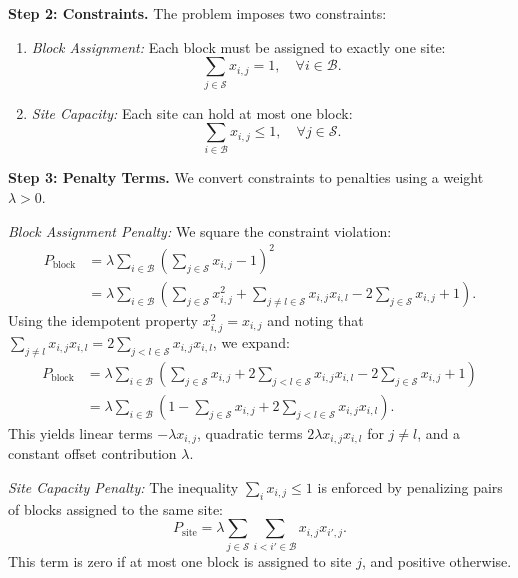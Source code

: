 \documentclass[12pt]{article}
\begin{document}
\textbf{Step 2: Constraints.}
The problem imposes two constraints:
\begin{enumerate}
    \item \textit{Block Assignment:} Each block must be assigned to exactly one site:
    \begin{equation}
        \sum_{j \in \mathcal{S}} x_{i,j} = 1, \quad \forall i \in \mathcal{B}.
    \end{equation}
    \item \textit{Site Capacity:} Each site can hold at most one block:
    \begin{equation}
        \sum_{i \in \mathcal{B}} x_{i,j} \le 1, \quad \forall j \in \mathcal{S}.
    \end{equation}
\end{enumerate}

\textbf{Step 3: Penalty Terms.}
We convert constraints to penalties using a weight $\lambda > 0$.

\textit{Block Assignment Penalty:}
We square the constraint violation:
\begin{align}
    P_{\text{block}} &= \lambda \sum_{i \in \mathcal{B}} \left( \sum_{j \in \mathcal{S}} x_{i,j} - 1 \right)^2 \\
    &= \lambda \sum_{i \in \mathcal{B}} \left( \sum_{j \in \mathcal{S}} x_{i,j}^2 + \sum_{j \neq l \in \mathcal{S}} x_{i,j} x_{i,l} - 2 \sum_{j \in \mathcal{S}} x_{i,j} + 1 \right).
\end{align}
Using the idempotent property $x_{i,j}^2 = x_{i,j}$ and noting that $\sum_{j \neq l} x_{i,j} x_{i,l} = 2 \sum_{j < l \in \mathcal{S}} x_{i,j} x_{i,l}$, we expand:
\begin{align}
    P_{\text{block}} &= \lambda \sum_{i \in \mathcal{B}} \left( \sum_{j \in \mathcal{S}} x_{i,j} + 2 \sum_{j < l \in \mathcal{S}} x_{i,j} x_{i,l} - 2 \sum_{j \in \mathcal{S}} x_{i,j} + 1 \right) \\
    &= \lambda \sum_{i \in \mathcal{B}} \left( 1 - \sum_{j \in \mathcal{S}} x_{i,j} + 2 \sum_{j < l \in \mathcal{S}} x_{i,j} x_{i,l} \right).
\end{align}
This yields linear terms $-\lambda x_{i,j}$, quadratic terms $2\lambda x_{i,j} x_{i,l}$ for $j \neq l$, and a constant offset contribution $\lambda$.

\textit{Site Capacity Penalty:}
The inequality $\sum_{i} x_{i,j} \le 1$ is enforced by penalizing pairs of blocks assigned to the same site:
\begin{equation}
    P_{\text{site}} = \lambda \sum_{j \in \mathcal{S}} \sum_{i < i' \in \mathcal{B}} x_{i,j} x_{i',j}.
\end{equation}
This term is zero if at most one block is assigned to site $j$, and positive otherwise.
\end{document}
